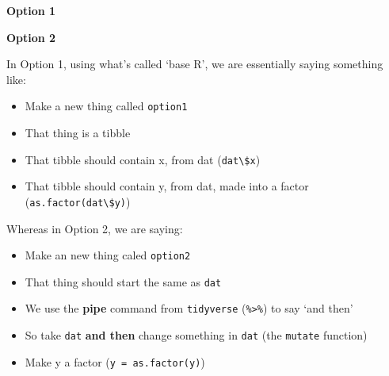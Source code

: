 \documentclass[
]{book}
\newenvironment{Shaded}{\begin{snugshade}}{\end{snugshade}}
\newcommand{\DataTypeTok}[1]{\textcolor[rgb]{0.13,0.29,0.53}{#1}}
\newcommand{\KeywordTok}[1]{\textcolor[rgb]{0.13,0.29,0.53}{\textbf{#1}}}
\newcommand{\NormalTok}[1]{#1}
\newcommand{\OperatorTok}[1]{\textcolor[rgb]{0.81,0.36,0.00}{\textbf{#1}}}
\newcommand{\StringTok}[1]{\textcolor[rgb]{0.31,0.60,0.02}{#1}}
\begin{document}
\textbf{Option 1}

\begin{Shaded}
\end{Shaded}

\textbf{Option 2}

\begin{Shaded}
\end{Shaded}

\begin{translate}
In Option 1, using what's called `base R', we are essentially saying
something like:

\begin{itemize}
\item
  Make a new thing called \texttt{option1}
\item
  That thing is a tibble
\item
  That tibble should contain x, from dat
  (\texttt{dat\textbackslash{}\$x})
\item
  That tibble should contain y, from dat, made into a factor
  (\texttt{as.factor(dat\textbackslash{}\$y)})
\end{itemize}

Whereas in Option 2, we are saying:

\begin{itemize}
\item
  Make an new thing caled \texttt{option2}
\item
  That thing should start the same as \texttt{dat}
\item
  We use the \textbf{pipe} command from \texttt{tidyverse}
  (\texttt{\%\textgreater{}\%}) to say `and then'
\item
  So take \texttt{dat} \textbf{and then} change something in
  \texttt{dat} (the \texttt{mutate} function)
\item
  Make y a factor (\texttt{y\ =\ as.factor(y)})
\end{itemize}
\end{translate}
\end{document}
